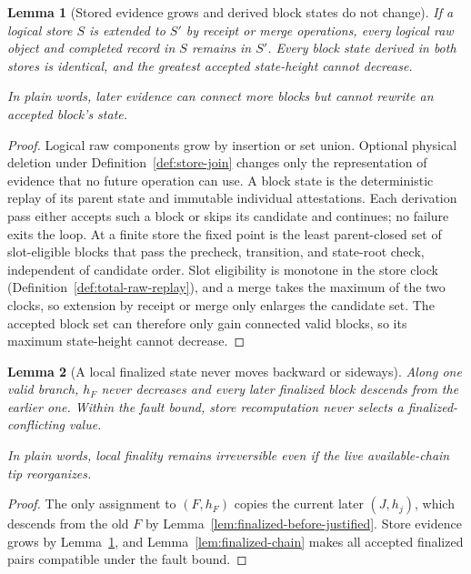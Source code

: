 \ifx\litemode\undefined\documentclass{article}\fi
\theoremstyle{plain}
\newtheorem{lemma}{Lemma}
\theoremstyle{definition}
\theoremstyle{remark}
\begin{document}
\begin{lemma}[Stored evidence grows and derived block states do not change]
\label{lem:store-monotonicity}
If a logical store \(S\) is extended to \(S'\) by receipt or merge
operations, every logical raw object and completed record in \(S\) remains in
\(S'\).  Every block state derived in both stores is identical, and the
greatest accepted state-height cannot decrease.

In plain words, later evidence can connect more blocks but cannot rewrite an
accepted block's state.
\end{lemma}

\begin{proof}
Logical raw components grow by insertion or set union.  Optional physical
deletion under Definition~\ref{def:store-join} changes only the representation
of evidence that no future operation can use.  A block state is the
deterministic replay of its parent state and immutable individual
attestations.  Each derivation pass either accepts such a block or skips its
candidate and continues; no failure exits the loop.  At a finite store the
fixed point is the least parent-closed set of slot-eligible blocks that
pass the precheck, transition, and state-root check, independent of
candidate order.  Slot eligibility is monotone in the store clock
(Definition~\ref{def:total-raw-replay}), and a merge takes the maximum
of the two clocks, so extension by receipt or merge only enlarges the
candidate set.  The
accepted block set can therefore only gain connected valid blocks, so its
maximum state-height cannot decrease.
\end{proof}

\begin{lemma}[A local finalized state never moves backward or sideways]
\label{lem:local-finality-irreversible}
Along one valid branch, \(h_F\) never decreases and every later finalized
block descends from the earlier one.  Within the fault bound, store
recomputation never selects a finalized-conflicting value.

In plain words, local finality remains irreversible even if the live
available-chain tip reorganizes.
\end{lemma}

\begin{proof}
The only assignment to \((F,h_F)\) copies the current later
\((J,h_j)\), which descends from the old \(F\) by
Lemma~\ref{lem:finalized-before-justified}.  Store evidence grows by
Lemma~\ref{lem:store-monotonicity}, and
Lemma~\ref{lem:finalized-chain} makes all accepted finalized pairs compatible
under the fault bound.
\end{proof}
\end{document}

